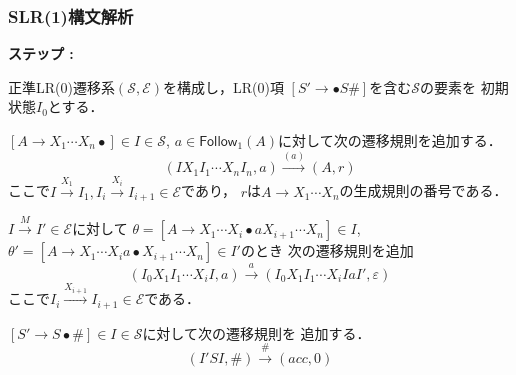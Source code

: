 \documentclass[dvipdfmx]{beamer}
\newcounter{coffee}
\begin{document}
\begin{frame}
  \frametitle{SLR(1)構文解析}
  {\small
    \begin{list}{{\rm\bf ステップ :}}{}
      \item 正準LR(0)遷移系$(\mathcal{S},\mathcal{E})$を構成し，LR(0)項
            $[S'\rightarrow\bullet S\texttt{\#}]$を含む$\mathcal{S}$の要素を
            初期状態$I_0$とする．
      \item[{\bf ステップ2':}] $[A\rightarrow X_1\cdots X_n\bullet]\in I\in\mathcal{S}$,
            $a\in\mathsf{Follow}_1(A)$に対して次の遷移規則を追加する．
            \[(IX_1I_1\cdots X_nI_n,a)\xrightarrow{(a)}(A,r)\]
            ここで$I\xrightarrow{X_1}I_1,I_i\xrightarrow{X_i}I_{i+1}\in\mathcal{E}$であり，
            $r$は$A\rightarrow X_1\cdots X_n$の生成規則の番号である．
            \addtocounter{coffee}{1}
      \item $I\xrightarrow{M}I'\in\mathcal{E}$に対して
            $\theta=[A\rightarrow X_1\cdots X_i\bullet a X_{i+1}\cdots X_n]\in I$,
            $\theta'=[A\rightarrow X_1\cdots X_i a\bullet X_{i+1}\cdots X_n]\in I'$のとき
            次の遷移規則を追加
            \[(I_0X_1I_1\cdots X_iI,a)\xrightarrow{a}(I_0X_1I_1\cdots X_iIaI',\varepsilon)\]
            ここで$I_i\xrightarrow{X_{i+1}}I_{i+1}\in\mathcal{E}$である．
      \item $[S'\rightarrow S\bullet\texttt{\#}]\in I\in\mathcal{S}$に対して次の遷移規則を
            追加する．
            \[(I'SI,\texttt{\#})\xrightarrow{\texttt{\#}}(acc,0)\]
    \end{list}
  }
\end{frame}
\end{document}
